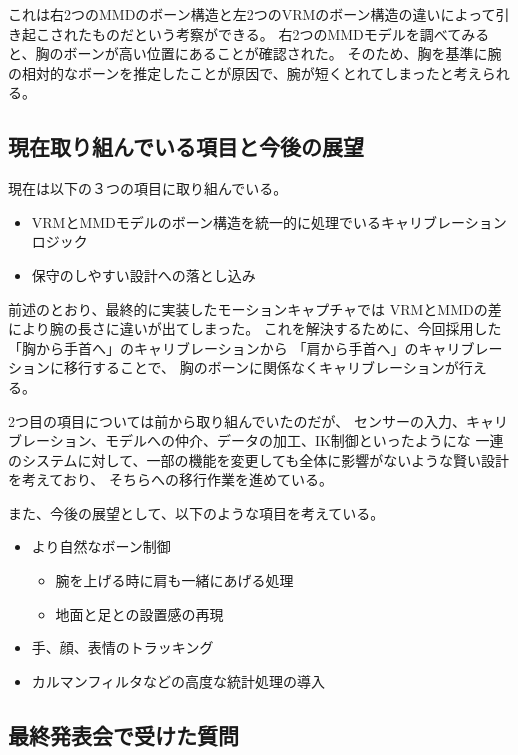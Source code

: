 \documentclass[a4j]{jsarticle}
\begin{document}
これは右2つのMMDのボーン構造と左2つのVRMのボーン構造の違いによって引き起こされたものだという考察ができる。
右2つのMMDモデルを調べてみると、胸のボーンが高い位置にあることが確認された。
そのため、胸を基準に腕の相対的なボーンを推定したことが原因で、腕が短くとれてしまったと考えられる。

\subsection{現在取り組んでいる項目と今後の展望}

現在は以下の３つの項目に取り組んでいる。

\begin{itemize}
  \item VRMとMMDモデルのボーン構造を統一的に処理でいるキャリブレーションロジック
  \item 保守のしやすい設計への落とし込み
\end{itemize}

前述のとおり、最終的に実装したモーションキャプチャでは
VRMとMMDの差により腕の長さに違いが出てしまった。
これを解決するために、今回採用した「胸から手首へ」のキャリブレーションから
「肩から手首へ」のキャリブレーションに移行することで、
胸のボーンに関係なくキャリブレーションが行える。

2つ目の項目については前から取り組んでいたのだが、
センサーの入力、キャリブレーション、モデルへの仲介、データの加工、IK制御といったようにな
一連のシステムに対して、一部の機能を変更しても全体に影響がないような賢い設計を考えており、
そちらへの移行作業を進めている。

また、今後の展望として、以下のような項目を考えている。

\begin{itemize}
  \item より自然なボーン制御
  \begin{itemize}
    \item 腕を上げる時に肩も一緒にあげる処理
    \item 地面と足との設置感の再現
  \end{itemize}
  \item 手、顔、表情のトラッキング
  \item カルマンフィルタなどの高度な統計処理の導入
\end{itemize}

\subsection{最終発表会で受けた質問}
\end{document}
